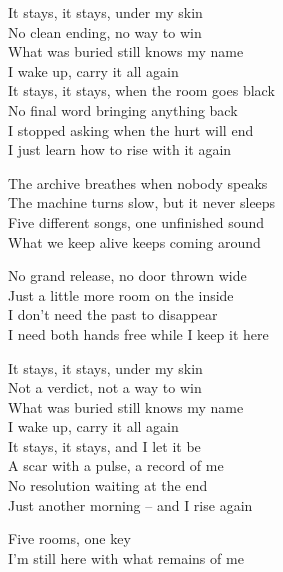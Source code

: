 \begin{lyrics}
It stays, it stays, under my skin\\
No clean ending, no way to win\\
What was buried still knows my name\\
I wake up, carry it all again\\
It stays, it stays, when the room goes black\\
No final word bringing anything back\\
I stopped asking when the hurt will end\\
I just learn how to rise with it again

The archive breathes when nobody speaks\\
The machine turns slow, but it never sleeps\\
Five different songs, one unfinished sound\\
What we keep alive keeps coming around

No grand release, no door thrown wide\\
Just a little more room on the inside\\
I don't need the past to disappear\\
I need both hands free while I keep it here

It stays, it stays, under my skin\\
Not a verdict, not a way to win\\
What was buried still knows my name\\
I wake up, carry it all again\\
It stays, it stays, and I let it be\\
A scar with a pulse, a record of me\\
No resolution waiting at the end\\
Just another morning -- and I rise again

Five rooms, one key\\
I'm still here with what remains of me
\end{lyrics}


